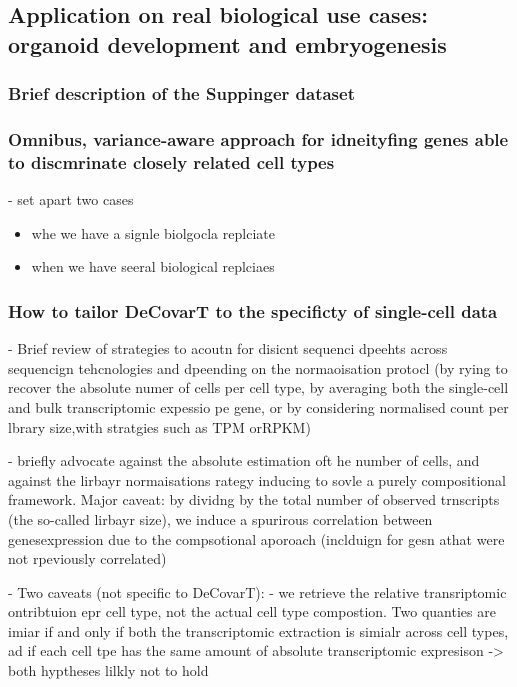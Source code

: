 \documentclass[pdflatex, sn-nature]{sn-jnl}
\theoremstyle{thmstyleone}%
\theoremstyle{thmstyletwo}%
\theoremstyle{thmstylethree}%
\begin{document}
    \subsection{Application on real biological use cases: organoid development and embryogenesis}

  \subsubsection{Brief description of the Suppinger dataset}
  
  \subsubsection{Omnibus, variance-aware approach for idneityfing genes able to discmrinate closely related cell types}
  - set apart two cases
  \begin{itemize}
    \item whe we have a signle biolgocla replciate
    \item when we have seeral biological replciaes
  \end{itemize}
    \subsubsection{How to tailor DeCovarT to the specificty of single-cell data}
    - Brief review of strategies to acoutn for disicnt sequenci dpeehts across sequencign tehcnologies and dpeending on the normaoisation protocl (by 
    rying to recover the absolute numer of cells per cell type, by averaging both the single-cell and bulk transcriptomic expessio pe gene, 
    or by considering normalised count per lbrary size,with stratgies such as TPM orRPKM)

    - briefly advocate against the absolute estimation oft he number of cells, and against the lirbayr normaisations rategy
    inducing to sovle a purely compositional framework. Major caveat: by dividng by the total number of observed trnscripts (the so-called lirbayr size),
    we induce a spurirous correlation between genesexpression due to the compsotional aporoach (inclduign for gesn athat were not rpeviously correlated)
    
    - Two caveats (not specific to DeCovarT):
      - we retrieve the relative transriptomic ontribtuion epr cell type, not the actual cell type compostion. 
      Two quanties are imiar if and only if both the transcriptomic extraction is simialr across cell types, 
      ad if each cell tpe has the same amount of absolute transcriptomic expresison -> both hyptheses lilkly not to hold
\end{document}
